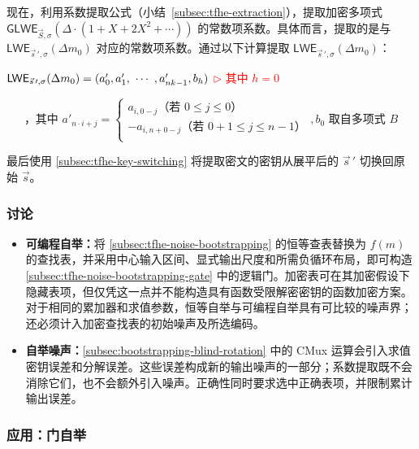 \begin{enumerate}
现在，利用系数提取公式（小结~\ref{subsec:tfhe-extraction}），提取加密多项式 $\textsf{GLWE}_{\vec{S}, \sigma}(\Delta \cdot (1+X+2X^2+\cdots))$ 的常数项系数。具体而言，提取的是与 $\textsf{LWE}_{\vec{s}\,\prime, \sigma}(\Delta m_0)$ 对应的常数项系数。通过以下计算提取 $\textsf{LWE}_{\vec{s}\,\prime, \sigma}(\Delta m_0)$：

$\textsf{LWE}_{\vec{s}\,\prime, \sigma}(\Delta m_0) = (a_0', a_1', \text{ } \text{$\cdots$} \text{ } , a_{nk-1}', b_h)$ \textcolor{red}{ $\rhd$ 其中 $h = 0$}

\[
    \text{，其中 } a'_{n \cdot i + j} =   
    \begin{cases}
      a_{i,0 - j} \text{（若 } 0 \leq j \leq 0\text{）}\\
      -a_{i,n + 0 - j} \text{（若 } 0+1 \leq j \leq n-1\text{）}\\
  \end{cases}
, b_0 \text{ 取自多项式 } B
\]


最后使用 \autoref{subsec:tfhe-key-switching} 将提取密文的密钥从展平后的 $\vec s\,\prime$ 切换回原始 $\vec s$。

\end{enumerate}


\subsubsection{讨论}
\label{subsec:tfhe-noise-bootstrapping-discussion}

\begin{itemize}
\item \textbf{可编程自举：}将 \autoref{subsec:tfhe-noise-bootstrapping} 的恒等查表替换为 $f(m)$ 的查找表，并采用中心输入区间、显式输出尺度和所需负循环布局，即可构造 \autoref{subsec:tfhe-noise-bootstrapping-gate} 中的逻辑门。加密表可在其加密假设下隐藏表项，但仅凭这一点并不能构造具有函数受限解密密钥的函数加密方案。对于相同的累加器和求值参数，恒等自举与可编程自举具有可比较的噪声界；还必须计入加密查找表的初始噪声及所选编码。
\item \textbf{自举噪声：}\autoref{subsec:bootstrapping-blind-rotation} 中的 CMux 运算会引入求值密钥误差和分解误差。这些误差构成新的输出噪声的一部分；系数提取既不会消除它们，也不会额外引入噪声。正确性同时要求选中正确表项，并限制累计输出误差。
\end{itemize}


\subsubsection{应用：门自举}
\label{subsec:tfhe-noise-bootstrapping-gate}

